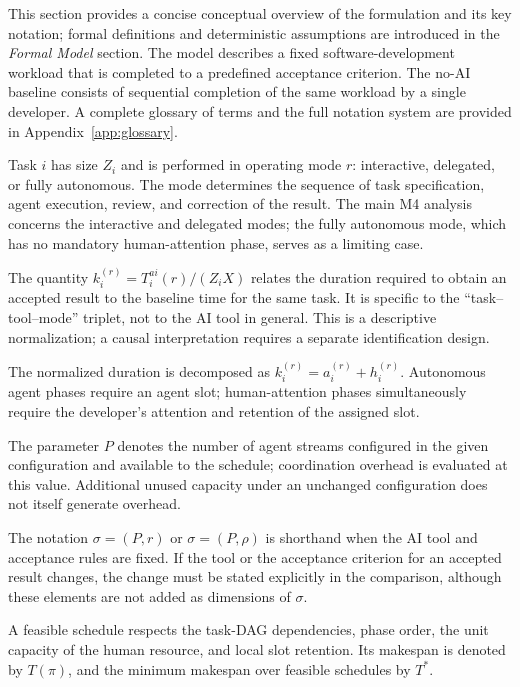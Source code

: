 This section provides a concise conceptual overview of the formulation and its
key notation; formal definitions and deterministic assumptions are introduced
in the \emph{Formal Model} section. The model describes a fixed software-development workload that is completed to
a predefined acceptance criterion. The no-AI baseline consists of sequential
completion of the same workload by a single developer. A complete glossary of
terms and the full notation system are provided in
Appendix~\ref{app:glossary}.

\begin{description}[style=nextline]
  \item[Task and mode.] Task $i$ has size $Z_i$ and is performed in operating
  mode $r$: interactive, delegated, or fully autonomous. The mode determines
  the sequence of task specification, agent execution, review, and correction
  of the result. The main M4 analysis concerns the interactive and delegated
  modes; the fully autonomous mode, which has no mandatory human-attention
  phase, serves as a limiting case.

  \item[Normalized AI-assisted duration.] The quantity
  $k_i^{(r)}=T_i^{ai}(r)/(Z_iX)$ relates the duration required to obtain an
  accepted result to the baseline time for the same task. It is specific to
  the ``task--tool--mode'' triplet, not to the AI tool in general. This is a
  descriptive normalization; a causal interpretation requires a separate
  identification design.

  \item[Phases.] The normalized duration is decomposed as
  $k_i^{(r)}=a_i^{(r)}+h_i^{(r)}$. Autonomous agent phases require an agent
  slot; human-attention phases simultaneously require the developer's
  attention and retention of the assigned slot.

  \item[Configured parallelism.] The parameter $P$ denotes the number of agent
  streams configured in the given configuration and available to the schedule;
  coordination overhead is evaluated at this value. Additional unused capacity
  under an unchanged configuration does not itself generate overhead.

  \item[Configuration.] The notation $\sigma=(P,r)$ or $\sigma=(P,\rho)$ is
  shorthand when the AI tool and acceptance rules are fixed. If the tool or the
  acceptance criterion for an accepted result changes, the change must be
  stated explicitly in the comparison, although these elements are not added
  as dimensions of $\sigma$.

  \item[Schedule and makespan.] A feasible schedule respects the task-DAG
  dependencies, phase order, the unit capacity of the human resource, and local
  slot retention. Its makespan is denoted by $T(\pi)$, and the minimum makespan
  over feasible schedules by $T^*$.
\end{description}

